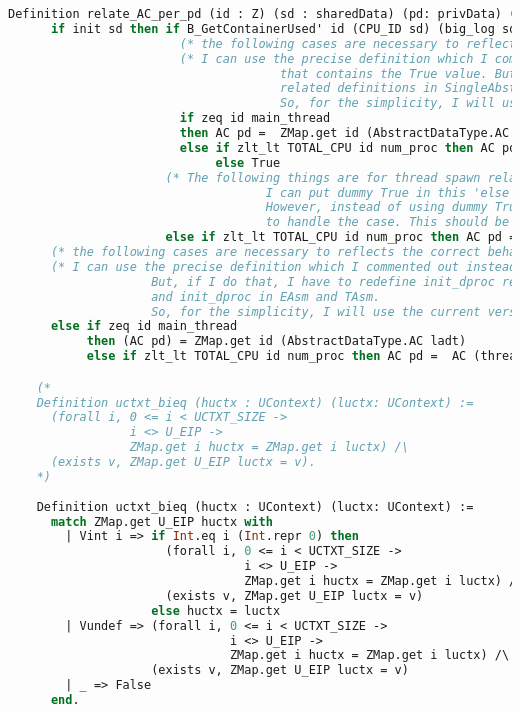 \begin{lstlisting}[language=Caml]
    Definition relate_AC_per_pd (id : Z) (sd : sharedData) (pd: privData) (ladt : AbstractDataType.RData) :=
      if init sd then if B_GetContainerUsed' id (CPU_ID sd) (big_log sd) then 
                        (* the following cases are necessary to reflects the correct behaviour of the initialization *)
                        (* I can use the precise definition which I commented out instead of the version 
                                      that contains the True value. But, if I do that, I have to redefine init_dproc
                                      related definitions in SingleAbstractDataType and init_dproc in EAsm and TAsm.
                                      So, for the simplicity, I will use the current version *)
                        if zeq id main_thread 
                        then AC pd =  ZMap.get id (AbstractDataType.AC ladt)
                        else if zlt_lt TOTAL_CPU id num_proc then AC pd = ZMap.get id (AbstractDataType.AC ladt) 
                             else True
                      (* The following things are for thread spawn related_RData.
                                    I can put dummy True in this 'else' case, and prove the case for thread_spawn. 
                                    However, instead of using dummy True, I decided to add the precise value 
                                    to handle the case. This should be much better then the dummy True *)
                      else if zlt_lt TOTAL_CPU id num_proc then AC pd = AC (thread_init_dproc id) else True
      (* the following cases are necessary to reflects the correct behaviour of the initialization *)
      (* I can use the precise definition which I commented out instead of the version that contains the True value.
                    But, if I do that, I have to redefine init_dproc related definitions in SingleAbstractDataType 
                    and init_dproc in EAsm and TAsm.
                    So, for the simplicity, I will use the current version *)
      else if zeq id main_thread 
           then (AC pd) = ZMap.get id (AbstractDataType.AC ladt) 
           else if zlt_lt TOTAL_CPU id num_proc then AC pd =  AC (thread_init_dproc id) else True.

    (*
    Definition uctxt_bieq (huctx : UContext) (luctx: UContext) :=
      (forall i, 0 <= i < UCTXT_SIZE -> 
                 i <> U_EIP ->
                 ZMap.get i huctx = ZMap.get i luctx) /\ 
      (exists v, ZMap.get U_EIP luctx = v).
    *)
      
    Definition uctxt_bieq (huctx : UContext) (luctx: UContext) :=
      match ZMap.get U_EIP huctx with 
        | Vint i => if Int.eq i (Int.repr 0) then 
                      (forall i, 0 <= i < UCTXT_SIZE -> 
                                 i <> U_EIP ->
                                 ZMap.get i huctx = ZMap.get i luctx) /\ 
                      (exists v, ZMap.get U_EIP luctx = v)
                    else huctx = luctx
        | Vundef => (forall i, 0 <= i < UCTXT_SIZE -> 
                               i <> U_EIP ->
                               ZMap.get i huctx = ZMap.get i luctx) /\ 
                    (exists v, ZMap.get U_EIP luctx = v)
        | _ => False
      end.


\end{lstlisting}
